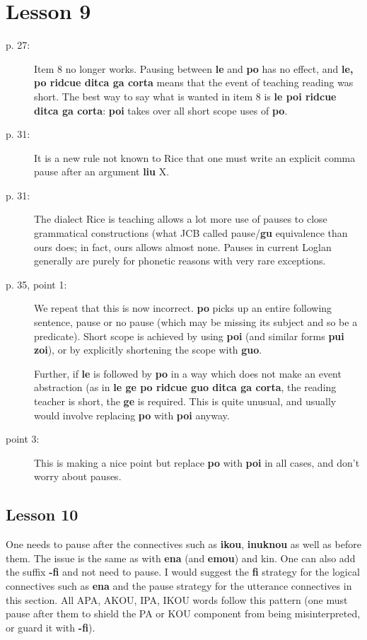 \documentclass[12pt]{article}
\begin{document}
\section{Lesson 9}
\begin{description}
\item[p. 27:]  Item 8 no longer works.  Pausing between {\bf le} and {\bf po} has no effect, 
and {\bf le, po ridcue ditca ga corta}  means that the event of teaching reading was short.
The best way to say what is wanted in item 8 is {\bf le poi ridcue ditca ga corta}:  {\bf poi} takes over all short scope uses of {\bf po}.  

\item[p. 31:]  It is a new rule not known to Rice that one must write an explicit comma pause after an argument {\bf liu} X.

\item[p. 31:]  The dialect Rice is teaching allows a lot more use of pauses to close grammatical constructions (what JCB called pause/{\bf gu} equivalence than ours does;  in fact, ours allows almost none.  Pauses in current Loglan generally are purely for phonetic reasons with very rare exceptions.

\item[p. 35, point 1:]  We repeat that this is now incorrect.  {\bf po} picks up an entire following sentence, pause or no pause (which may be missing its subject and so be a predicate).  Short scope is achieved by using {\bf poi} (and similar forms {\bf pui} {\bf zoi}), or by explicitly shortening the scope with {\bf guo}.

Further, if {\bf le} is followed by {\bf po} in a way which does not make an event abstraction
(as in {\bf le ge po ridcue guo ditca ga corta}, the reading teacher is short, the {\bf ge} is required.  This is quite unusual, and usually would involve replacing {\bf po} with {\bf poi} anyway.

\item[point 3:]  This is making a nice point but replace {\bf po} with {\bf poi} in all cases, and don't worry about pauses.



\end{description}

\begin{description}

\section{Lesson 10}

\item[p. 37:]  One needs to pause after the connectives such as {\bf ikou}, {\bf inuknou} as well as before
them.  The issue is the same as with {\bf ena} (and {\bf emou}) and kin.  One can also add the suffix {\bf -fi} and not need to pause.
I would suggest the {\bf fi} strategy for the logical connectives such as {\bf ena} and the pause strategy for the utterance connectives in this section.  All APA, AKOU, IPA, IKOU words follow this pattern (one must pause after them to shield the PA or KOU component from being misinterpreted, or guard it with {\bf -fi}).

\end{description}
\end{document}
